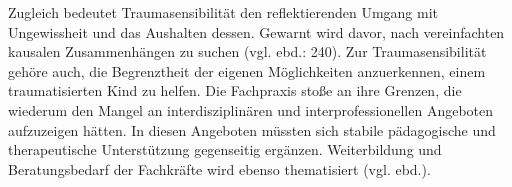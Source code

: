 Zugleich bedeutet Traumasensibilität den reflektierenden Umgang mit Ungewissheit und das Aushalten dessen. Gewarnt wird davor, nach vereinfachten kausalen Zusammenhängen zu suchen (vgl. ebd.: 240). Zur Traumasensibilität gehöre auch, die Begrenztheit der eigenen Möglichkeiten anzuerkennen, einem traumatisierten Kind zu helfen. Die Fachpraxis stoße an ihre Grenzen, die wiederum den Mangel an interdisziplinären und interprofessionellen Angeboten aufzuzeigen hätten. In diesen Angeboten müssten sich stabile pädagogische und therapeutische Unterstützung gegenseitig ergänzen. Weiterbildung und Beratungsbedarf der Fachkräfte wird ebenso thematisiert (vgl. ebd.).
